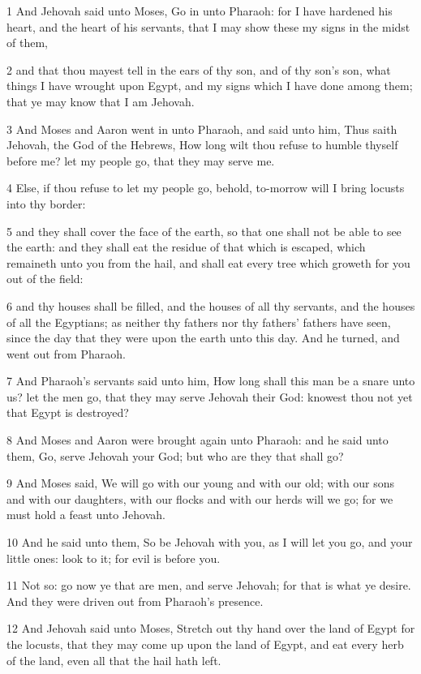 \par 1 And Jehovah said unto Moses, Go in unto Pharaoh: for I have hardened his heart, and the heart of his servants, that I may show these my signs in the midst of them,
\par 2 and that thou mayest tell in the ears of thy son, and of thy son's son, what things I have wrought upon Egypt, and my signs which I have done among them; that ye may know that I am Jehovah.
\par 3 And Moses and Aaron went in unto Pharaoh, and said unto him, Thus saith Jehovah, the God of the Hebrews, How long wilt thou refuse to humble thyself before me? let my people go, that they may serve me.
\par 4 Else, if thou refuse to let my people go, behold, to-morrow will I bring locusts into thy border:
\par 5 and they shall cover the face of the earth, so that one shall not be able to see the earth: and they shall eat the residue of that which is escaped, which remaineth unto you from the hail, and shall eat every tree which groweth for you out of the field:
\par 6 and thy houses shall be filled, and the houses of all thy servants, and the houses of all the Egyptians; as neither thy fathers nor thy fathers' fathers have seen, since the day that they were upon the earth unto this day. And he turned, and went out from Pharaoh.
\par 7 And Pharaoh's servants said unto him, How long shall this man be a snare unto us? let the men go, that they may serve Jehovah their God: knowest thou not yet that Egypt is destroyed?
\par 8 And Moses and Aaron were brought again unto Pharaoh: and he said unto them, Go, serve Jehovah your God; but who are they that shall go?
\par 9 And Moses said, We will go with our young and with our old; with our sons and with our daughters, with our flocks and with our herds will we go; for we must hold a feast unto Jehovah.
\par 10 And he said unto them, So be Jehovah with you, as I will let you go, and your little ones: look to it; for evil is before you.
\par 11 Not so: go now ye that are men, and serve Jehovah; for that is what ye desire. And they were driven out from Pharaoh's presence.
\par 12 And Jehovah said unto Moses, Stretch out thy hand over the land of Egypt for the locusts, that they may come up upon the land of Egypt, and eat every herb of the land, even all that the hail hath left.
